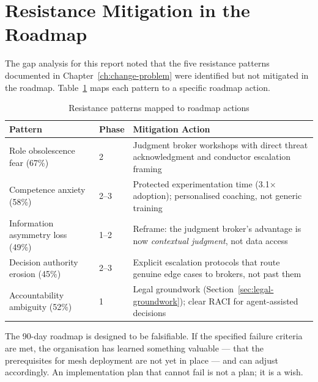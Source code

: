\section{Resistance Mitigation in the Roadmap}

The gap analysis for this report noted that the five resistance patterns documented in Chapter~\ref{ch:change-problem} were identified but not mitigated in the roadmap. Table~\ref{tab:resistance-mitigation} maps each pattern to a specific roadmap action.

\begin{table}[H]
\centering
\caption{Resistance patterns mapped to roadmap actions}
\label{tab:resistance-mitigation}
\begin{tabularx}{\textwidth}{l l X}
\toprule
\textbf{Pattern} & \textbf{Phase} & \textbf{Mitigation Action} \\
\midrule
Role obsolescence fear (67\%) & 2 & Judgment broker workshops with direct threat acknowledgment and conductor escalation framing \\
\addlinespace
Competence anxiety (58\%) & 2--3 & Protected experimentation time (3.1$\times$ adoption); personalised coaching, not generic training \\
\addlinespace
Information asymmetry loss (49\%) & 1--2 & Reframe: the judgment broker's advantage is now \emph{contextual judgment}, not data access \\
\addlinespace
Decision authority erosion (45\%) & 2--3 & Explicit escalation protocols that route genuine edge cases to brokers, not past them \\
\addlinespace
Accountability ambiguity (52\%) & 1 & Legal groundwork (Section~\ref{sec:legal-groundwork}); clear RACI for agent-assisted decisions \\
\bottomrule
\end{tabularx}
\end{table}

The 90-day roadmap is designed to be falsifiable. If the specified failure criteria are met, the organisation has learned something valuable --- that the prerequisites for mesh deployment are not yet in place --- and can adjust accordingly. An implementation plan that cannot fail is not a plan; it is a wish.
